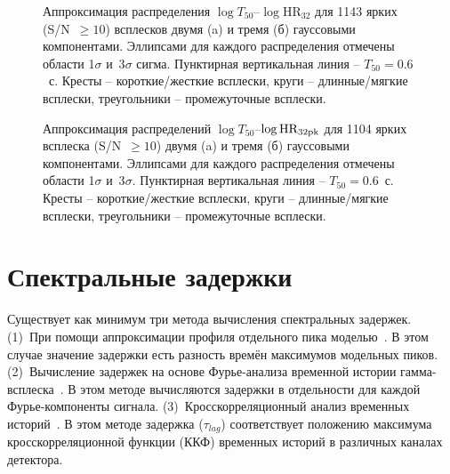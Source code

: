 \begin{figure}[h]
  \begin{minipage}[h]{0.5\textwidth}
  \end{minipage}
  \hfill
  \begin{minipage}[h]{0.5\textwidth}
  \end{minipage}
  \caption{Аппроксимация распределения $\log T_{50}$--$\log \mbox{HR}_{32}$ для 1143 ярких (S/N~$\geq 10$) всплесков двумя (a) и тремя (б)  гауссовыми компонентами. Эллипсами для каждого распределения отмечены области 1$\sigma$ и~3$\sigma$ сигма. Пунктирная вертикальная линия -- $T_{50} = 0.6$~с. Кресты -- короткие/жесткие всплески, круги -- длинные/мягкие всплески, треугольники -- промежуточные всплески.}
  \label{img:HRvsT50}  
\end{figure}

\begin{figure}[h]
  \begin{minipage}[h]{0.5\textwidth}
  \end{minipage}
  \hfill
  \begin{minipage}[h]{0.5\textwidth}
  \end{minipage}
  \caption{Аппроксимация распределений $\log T_{50}$--$\log \mbox{HR}_{32\mbox{\scriptsize pk}}$ для 1104 ярких всплеска (S/N~$\geq 10$) двумя (a) и тремя (б)  гауссовыми компонентами. Эллипсами для каждого распределения отмечены области 1$\sigma$ и~3$\sigma$. Пунктирная вертикальная линия -- $T_{50} = 0.6$~с. Кресты -- короткие/жесткие всплески, круги -- длинные/мягкие всплески, треугольники -- промежуточные всплески.}
  \label{img:HRpkvsT50}  
\end{figure}

\clearpage

\section{Спектральные задержки}\label{sec:Lags}
Существует как минимум три метода вычисления спектральных задержек. (1)~При помощи аппроксимации  профиля отдельного пика моделью~\citep{Norris_2005, Hakkila_2008}. В этом случае значение задержки есть разность времён максимумов модельных пиков. (2)~Вычисление задержек на основе Фурье-анализа временной истории гамма-всплеска~\citep{Li_2004}. В этом методе вычисляются задержки в отдельности для каждой Фурье-компоненты сигнала. (3)~Кросскорреляционный анализ временных историй~\citep{Band_1997, Norris_2000}. В этом методе задержка ($\tau_{lag}$) соответствует положению максимума кросскорреляционной функции (ККФ) временных историй в различных каналах детектора.

